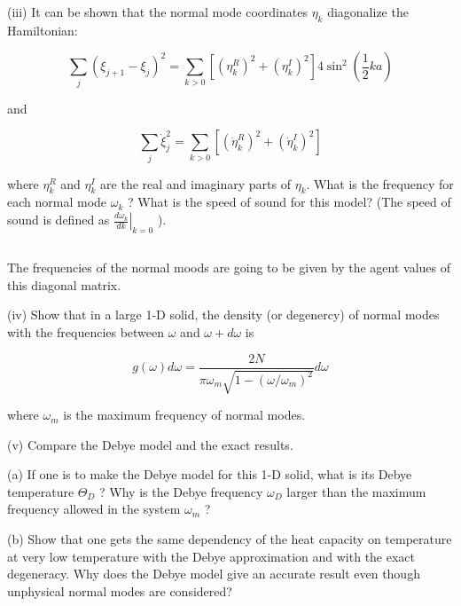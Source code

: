 \documentclass[12pt]{article}
\begin{document}
(iii) It can be shown that the normal mode coordinates $\eta_{k}$ diagonalize the Hamiltonian:


\begin{equation*}
\sum_{j}\left(\xi_{j+1}-\xi_{j}\right)^{2}=\sum_{k>0}\left[\left(\eta_{k}^{R}\right)^{2}+\left(\eta_{k}^{I}\right)^{2}\right] 4 \sin ^{2}\left(\frac{1}{2} k a\right) \tag{8}
\end{equation*}


and


\begin{equation*}
\sum_{j} \dot{\xi}_{j}^{2}=\sum_{k>0}\left[\left(\dot{\eta}_{k}^{R}\right)^{2}+\left(\dot{\eta}_{k}^{I}\right)^{2}\right] \tag{9}
\end{equation*}


where $\eta_{k}^{R}$ and $\eta_{k}^{I}$ are the real and imaginary parts of $\eta_{k}$. What is the frequency for each normal mode $\omega_{k}$ ? What is the speed of sound for this model? (The speed of sound is defined as $\left.\frac{d \omega_{k}}{d k}\right|_{k=0}$ ).
\subsection{}
The frequencies of the normal moods are going to be given by the agent values of this diagonal matrix.

(iv) Show that in a large 1-D solid, the density (or degenercy) of normal modes with the frequencies between $\omega$ and $\omega+d \omega$ is


\begin{equation*}
g(\omega) d \omega=\frac{2 N}{\pi \omega_{m} \sqrt{1-\left(\omega / \omega_{m}\right)^{2}}} d \omega \tag{10}
\end{equation*}


where $\omega_{m}$ is the maximum frequency of normal modes.

(v) Compare the Debye model and the exact results.

(a) If one is to make the Debye model for this 1-D solid, what is its Debye temperature $\Theta_{D}$ ? Why is the Debye frequency $\omega_{D}$ larger than the maximum frequency allowed in the system $\omega_{m}$ ?

(b) Show that one gets the same dependency of the heat capacity on temperature at very low temperature with the Debye approximation and with the exact degeneracy. Why does the Debye model give an accurate result even though unphysical normal modes are considered?
\end{document}
